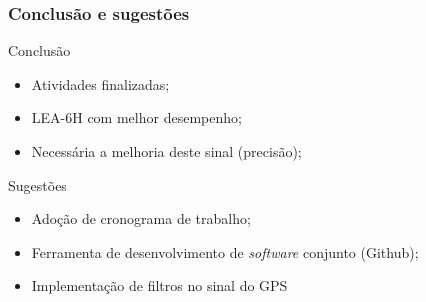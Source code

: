 \begin{frame}
\frametitle{Conclusão e sugestões}

\begin{block}{Conclusão}
\begin{itemize}
\item Atividades finalizadas;
\item LEA-6H com melhor desempenho;
\item Necessária a melhoria deste sinal (precisão);
\end{itemize}
\end{block}

\begin{block}{Sugestões}
\begin{itemize}
\item Adoção de cronograma de trabalho;
\item Ferramenta de desenvolvimento de \textit{software} conjunto (Github);
\item Implementação de filtros no sinal do GPS
\end{itemize}
\end{block}

\end{frame}

